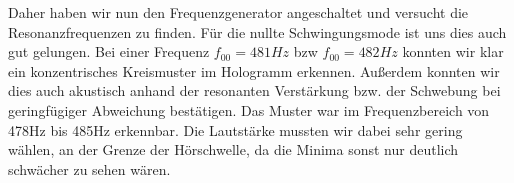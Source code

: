 

Daher haben wir nun den Frequenzgenerator angeschaltet und versucht die Resonanzfrequenzen zu finden. Für die nullte Schwingungsmode ist uns dies auch gut gelungen. Bei einer Frequenz $f_{00} = 481 Hz$ %
bzw $f_{00} = 482 Hz$ %
konnten wir klar ein konzentrisches Kreismuster im Hologramm erkennen. Außerdem konnten wir dies auch akustisch anhand der resonanten Verstärkung bzw. der Schwebung bei geringfügiger Abweichung bestätigen. Das Muster war im Frequenzbereich von 478Hz bis 485Hz erkennbar. Die Lautstärke mussten wir dabei sehr gering wählen, an der Grenze der Hörschwelle, da die Minima sonst nur deutlich schwächer zu sehen wären. 